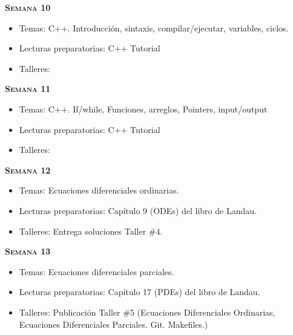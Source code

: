 \documentclass[letterpaper,10pt,onecolumn]{article}
\begin{document}

\noindent\textbf{\textsc{Semana 10}}\\[-0.5cm]
\begin{itemize}
\item Temas: C++. Introducción, sintaxis, compilar/ejecutar,
variables, ciclos. \\[-0.6cm]
\item Lecturas preparatorias: C++ Tutorial\\[-0.6cm]
\item Talleres: 
\\[-0.6cm]
\end{itemize}


\noindent\textbf{\textsc{Semana 11}}\\[-0.5cm]
\begin{itemize}
\item Temas: C++. If/while, Funciones, arreglos, Pointers, input/output \\[-0.6cm]
\item Lecturas preparatorias: C++ Tutorial\\[-0.6cm]
\item Talleres: 
\\[-0.6cm]
\end{itemize}

\noindent\textbf{\textsc{Semana 12}}\\[-0.5cm]
\begin{itemize}
\item Temas: Ecuaciones diferenciales ordinarias. \\[-0.6cm]
\item Lecturas preparatorias: Cap\'itulo 9 (ODEs) del libro de
  Landau. \\[-0.6cm] 
\item Talleres: 
Entrega soluciones Taller \#4. 
\\[-0.6cm]
\end{itemize}

\noindent\textbf{\textsc{Semana 13}}\\[-0.5cm]
\begin{itemize}
\item Temas: Ecuaciones diferenciales parciales. \\[-0.6cm]
\item Lecturas preparatorias: Cap\'itulo 17 (PDEs) del libro de
  Landau. \\[-0.6cm] 
\item Talleres: 
Publicaci\'on Taller \#5
(Ecuaciones Diferenciales Ordinarias, Ecuaciones Diferenciales
Parciales. Git. Makefiles.)
\\[-0.6cm]
\end{itemize}
\end{document}
